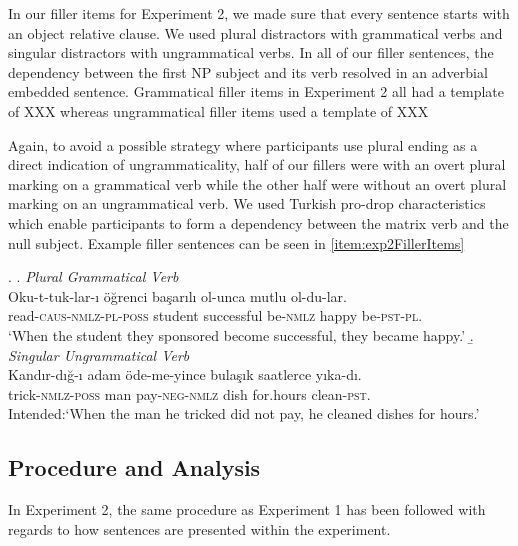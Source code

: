 \documentclass[doc,a4paper,man,natbib,floatsintext,noextraspace]{apa6}\usepackage[]{graphicx}\usepackage[]{color}
\begin{document}
In our filler items for Experiment 2, we made sure that every sentence starts with an object relative clause. We used plural distractors with grammatical verbs and singular distractors with ungrammatical verbs. In all of our filler sentences, the dependency between the first NP subject and its verb resolved in an adverbial embedded sentence. Grammatical filler items in Experiment 2 all had a template of
XXX
whereas ungrammatical filler items used a template of 
XXX

Again, to avoid a possible strategy where participants use plural ending as a direct indication of ungrammaticality, half of our fillers were with an overt plural marking on a grammatical verb while the other half were without an overt plural marking on an ungrammatical verb. We used Turkish pro-drop characteristics which enable participants to form a dependency between the matrix verb and the null subject. Example filler sentences can be seen in \ref{item:exp2FillerItems} 

\ex. \label{item:exp2FillerItems}
%
\a. \textit{Plural Grammatical Verb}\\ 
  \gll Oku-t-tuk-lar-ı öğrenci başarılı ol-unca mutlu ol-du-lar.\\ 
  read-\textsc{caus}-\textsc{nmlz}-\textsc{pl}-\textsc{poss}  student successful be-\textsc{nmlz} happy be-\textsc{pst}-\textsc{pl}.\\
  \glt `When the student they sponsored become successful, they became happy.' 
%
\b. \textit{Singular Ungrammatical Verb}\\ 
  \gll *Kandır-dığ-ı adam öde-me-yince bulaşık saatlerce yıka-dı.\\ 
  trick-\textsc{nmlz}-\textsc{poss}  man pay-\textsc{neg}-\textsc{nmlz} dish for.hours clean-\textsc{pst}.\\
  \glt Intended:`When the man he tricked did not pay, he cleaned dishes for hours.'


\subsection{Procedure and Analysis} \label{sec:exp2:procedure_analysis}





In Experiment 2, the same procedure as Experiment 1 has been followed with regards to how sentences are presented within the experiment. 
\end{document}
